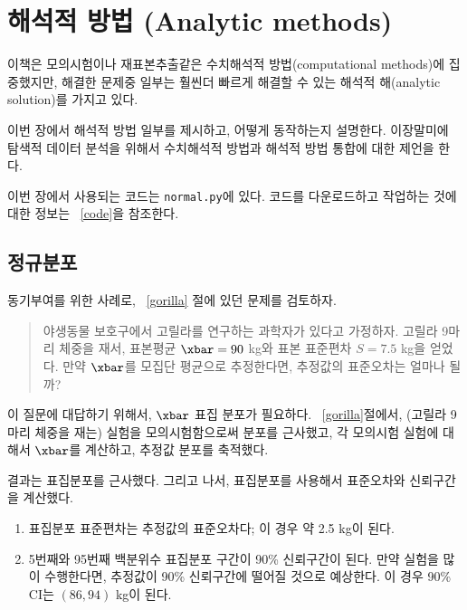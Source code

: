 
\chapter{해석적 방법 (Analytic methods)}
\label{analysis}

이책은 모의시험이나 재표본추출같은 수치해석적 방법(computational methods)에 집중했지만, 해결한 문제중 일부는 훨씬더 빠르게 해결할 수 있는 해석적 해(analytic solution)를 가지고 있다.

이번 장에서 해석적 방법 일부를 제시하고, 어떻게 동작하는지 설명한다. 이장말미에 탐색적 데이터 분석을 위해서 수치해석적 방법과 해석적 방법 통합에 대한 제언을 한다.

이번 장에서 사용되는 코드는 {\tt normal.py}에 있다.
코드를 다운로드하고 작업하는 것에 대한 정보는 ~\ref{code}을 참조한다.


\section{정규분포}
\label{why_normal}

동기부여를 위한 사례로, ~\ref{gorilla} 절에 있던 문제를 검토하자.

\begin{quotation}
\noindent 야생동물 보호구에서 고릴라를 연구하는 과학자가 있다고 가정하자. 고릴라 9마리 체중을 재서, 표본평균 $\xbar=90$ kg와 표본 표준편차 $S=7.5$ kg을 얻었다. 만약 $\xbar$를 모집단 평균으로 추정한다면, 추정값의 표준오차는 얼마나 될까?
\end{quotation}

이 질문에 대답하기 위해서, $\xbar$ 표집 분포가 필요하다. ~\ref{gorilla}절에서, (고릴라 9마리 체중을 재는) 실험을 모의시험함으로써 분포를 근사했고, 각 모의시험 실험에 대해서 $\xbar$를 계산하고, 추정값 분포를 축적했다.

결과는 표집분포를 근사했다. 그리고 나서, 표집분포를 사용해서 표준오차와 신뢰구간을 계산했다.

\begin{enumerate}

\item 표집분포 표준편차는 추정값의 표준오차다; 이 경우 약 2.5 kg이 된다.

\item 5번째와 95번째 백분위수 표집분포 구간이 90\% 신뢰구간이 된다. 만약 실험을 많이 수행한다면, 추정값이 90\% 신뢰구간에 떨어질 것으로 예상한다. 이 경우 90\% CI는 $(86, 94)$ kg이 된다.

\end{enumerate}

